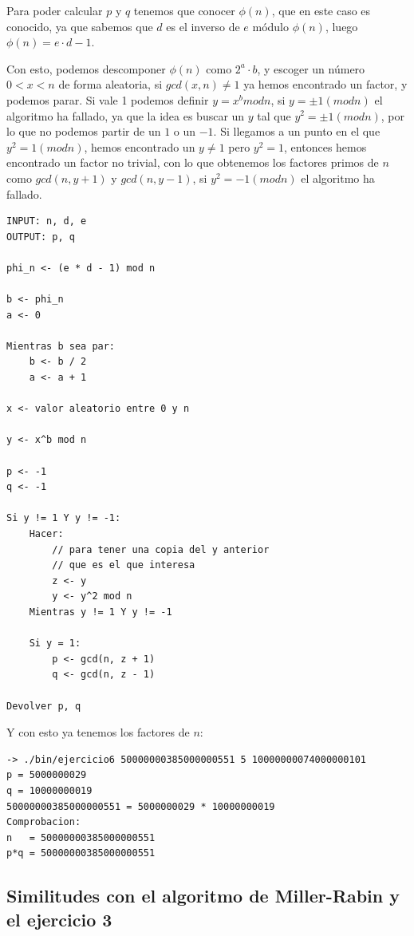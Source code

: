 \documentclass[12pt, spanish]{article}
\begin{document}
Para poder calcular $p$ y $q$ tenemos que conocer $\phi(n)$, que en este caso es conocido, ya que sabemos que $d$ es el inverso de $e$ módulo $\phi(n)$, luego $\phi(n) = e \cdot d - 1$.

Con esto, podemos descomponer $\phi(n)$ como $2^a \cdot b$, y escoger un número $0 < x < n$ de forma aleatoria, si $gcd(x, n) \not = 1$ ya hemos encontrado un factor, y podemos parar. Si vale 1 podemos definir $y = x^b mod n$, si $y = \pm 1 (mod n)$ el algoritmo ha fallado, ya que la idea es buscar un $y$ tal que $y^2 = \pm 1 (mod n)$, por lo que no podemos partir de un $1$ o un $-1$. Si llegamos a un punto en el que $y^2 = 1 (mod n)$, hemos encontrado un $y \not = 1$ pero $y^2 = 1$, entonces hemos encontrado un factor no trivial, con lo que obtenemos los factores primos de $n$ como $gcd(n, y + 1)$ y $gcd(n, y - 1)$, si $y^2 = -1 (mod n)$ el algoritmo ha fallado.


\begin{lstlisting}[caption={Funcion descomponer n}]
INPUT: n, d, e
OUTPUT: p, q

phi_n <- (e * d - 1) mod n

b <- phi_n
a <- 0

Mientras b sea par:
	b <- b / 2
	a <- a + 1

x <- valor aleatorio entre 0 y n

y <- x^b mod n

p <- -1
q <- -1

Si y != 1 Y y != -1:
	Hacer:
		// para tener una copia del y anterior
		// que es el que interesa
		z <- y
		y <- y^2 mod n
	Mientras y != 1 Y y != -1

	Si y = 1:
		p <- gcd(n, z + 1)
		q <- gcd(n, z - 1)

Devolver p, q
\end{lstlisting}

Y con esto ya tenemos los factores de $n$:

\begin{lstlisting}
-> ./bin/ejercicio6 50000000385000000551 5 10000000074000000101
p = 5000000029
q = 10000000019
50000000385000000551 = 5000000029 * 10000000019
Comprobacion:
n   = 50000000385000000551
p*q = 50000000385000000551
\end{lstlisting}


\subsection{Similitudes con el algoritmo de Miller-Rabin y el ejercicio 3}
\end{document}
